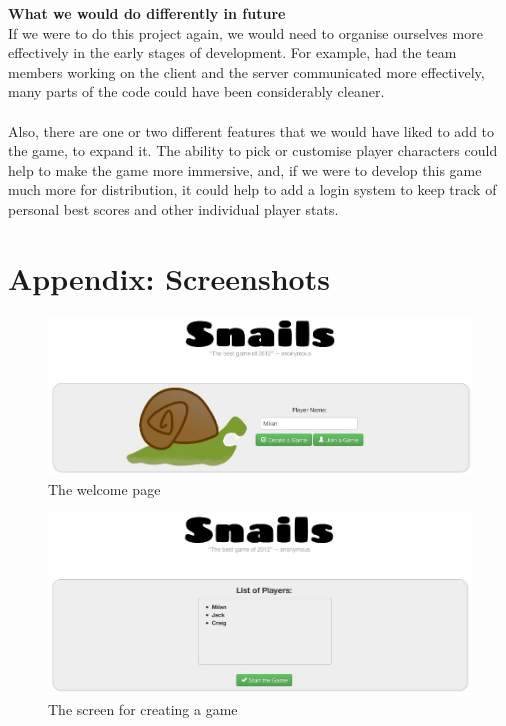 \documentclass{article}
\begin{document}
\textbf{What we would do differently in future} \\
If we were to do this project again, we would need to organise ourselves more effectively in the early stages of development. For example, had the team members working on the client and the server communicated more effectively, many parts of the code could have been considerably cleaner. \\ \\
Also, there are one or two different features that we would have liked to add to the game, to expand it. The ability to pick or customise player characters could help to make the game more immersive, and, if we were to develop this game much more for distribution, it could help to add a login system to keep track of personal best scores and other individual player stats.

\section{Appendix: Screenshots}

\begin{figure}[htb]
\centering
\includegraphics[width=1.0\textwidth]{index.jpg}
\caption{The welcome page}
\end{figure}

\begin{figure}[htb]
\centering
\includegraphics[width=1.0\textwidth]{create.jpg}
\caption{The screen for creating a game}
\end{figure}
\end{document}
